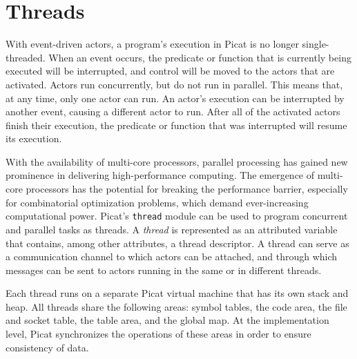 
\chapter{\label{chapter:thread}Threads}

With event-driven actors, a program's execution in Picat is no longer single-threaded. When an event occurs, the predicate or function that is currently being executed will be interrupted, and control will be moved to the actors that are activated. Actors run concurrently, but do not run in parallel. This means that, at any time, only one actor can run. An actor's execution can be interrupted by another event, causing a different actor to run. After all of the activated actors finish their execution, the predicate or function that was interrupted will resume its execution. 

With the availability of multi-core processors, parallel processing has gained new prominence in delivering high-performance computing. The emergence of multi-core processors has the potential for breaking the performance barrier, especially for combinatorial optimization problems, which demand ever-increasing computational power. Picat's \texttt{thread} module can be used to program concurrent and parallel tasks as threads. A \emph{thread} is represented as an attributed variable that contains, among other attributes, a thread descriptor. A thread can serve as a communication channel to which actors can be attached, and through which messages can be sent to actors running in the same or in different threads.

Each thread runs on a separate Picat virtual machine that has its own stack and heap. All threads share the following areas: symbol tables, the code area, the file and socket table, the table area, and the global map. At the implementation level, Picat synchronizes the operations of these areas in order to ensure consistency of data.

